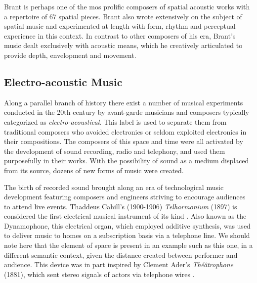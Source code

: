 Brant is perhaps one of the mos prolific composers of spatial acoustic works with a repertoire of 67 spatial pieces. Brant also wrote extensively on the subject of spatial music and experimented at length with form, rhythm and perceptual experience in this context. In contrast to other composers of his era, Brant's music dealt exclusively with acoustic means, which he creatively articulated to provide depth, envelopment and movement.  


\subsection{Electro-acoustic Music} \label{subsec:elec_acoustic_mus}

Along a parallel branch of history there exist a number of musical experiments conducted in the 20th century by avant-garde musicians and composers typically categorized as \textit{electro-acoustical}. This label is used to separate them from traditional composers who avoided electronics or seldom exploited electronics in their compositions. The composers of this space and time were all activated by the development of sound recording, radio and telephony, and used them purposefully in their works. With the possibility of sound as a medium displaced from its source, dozens of new forms of music were created.

The birth of recorded sound brought along an era of technological music development featuring composers and engineers striving to encourage audiences to attend live events. Thaddeus Cahill's (1900-1906) \textit{Telharmonium} (1897) is considered the first electrical musical instrument of its kind \cite{bode1984history}. Also known as the Dynamophone, this electrical organ, which employed additive synthesis, was used to deliver music to homes on a subscription basis via a telephone line. We should note here that the element of space is present in an example such as this one, in a different semantic context, given the distance created between performer and audience. This device was in part inspired by Clement Ader's \textit{Théâtrophone} (1881), which sent stereo signals of actors via telephone wires \cite{TheTelh3:online}.

